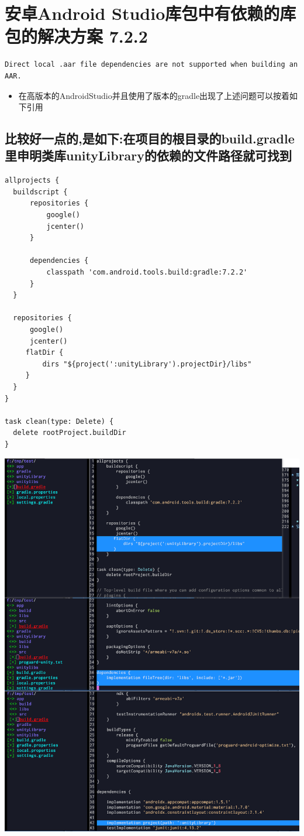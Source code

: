 \documentclass[9pt, b5paper]{article}
\begin{document}
\section{安卓Android Studio库包中有依赖的库包的解决方案 7.2.2}
\label{sec-7}
\begin{verbatim}
Direct local .aar file dependencies are not supported when building an AAR.
\end{verbatim}
\begin{itemize}
\item 在高版本的AndroidStudio并且使用了版本的gradle出现了上述问题可以按着如下引用
\end{itemize}
\subsection{比较好一点的,是如下:在项目的根目录的build.gradle里申明类库unityLibrary的依赖的文件路径就可找到}
\label{sec-7-1}
\begin{verbatim}
allprojects {
  buildscript {
      repositories {
          google()
          jcenter()
      }

      dependencies {
          classpath 'com.android.tools.build:gradle:7.2.2'
      }
  }

  repositories {
      google()
      jcenter()
     flatDir {
         dirs "${project(':unityLibrary').projectDir}/libs"
     }
  }
}

task clean(type: Delete) {
  delete rootProject.buildDir
}
\end{verbatim}

\includegraphics[width=.9\linewidth]{./pic/unityToAndroid_20221125_144439.png}
\end{document}

